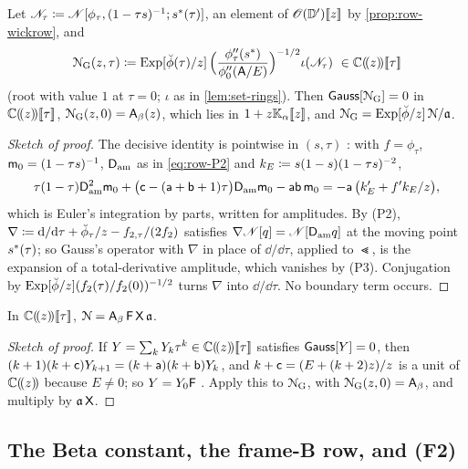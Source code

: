 \begin{prop}
\label{prop:row-gaussode}
Let $\mathscr{N}_{\tau}\coloneqq\mathscr{N}[\phi_\tau,(1-\tau s)^{-1};s^{\ast}(\tau)]$, an element of $\mathscr{O}(\mathbb{D}')[\![ z ]\!]$ by \cref{prop:row-wickrow}, and
\[
\Ngauss(z,\tau)\coloneqq\mathrm{Exp}[\dphi(\tau)/z]\,\Big(\frac{\phi_\tau''(\sast)}{\phi_0''(\wA/E)}\Big)^{-1/2}\iota(\Lt)\ \in\Cz\fps\tau
\]
(root with value $1$ at $\tau=0$; $\iota$ as in \cref{lem:set-rings}). Then $\mathsf{Gauss}[\mathcal{N}_{\mathrm{G}}]=0$ in $\mathbb{C}(\!(z)\!)[\![ \tau ]\!]$, $\mathcal{N}_{\mathrm{G}}(z,0)=\mathsf{A}_{\beta}(z)$, which lies in $1+z\mathbb{K}_{\alpha}[\![ z ]\!]$, and $\mathcal{N}_{\mathrm{G}}=\mathrm{Exp}[\breve{\phi}/z]\,\mathcal{N}/\mathfrak{a}$.
\end{prop}

\begin{proof}[Sketch of proof]
The decisive identity is pointwise in $(s,\tau)$ : with $f=\phi_\tau$, $\mathsf{m}_0=(1-\tau s)^{-1}$, $\mathsf{D}_{\mathrm{am}}$ as in \eqref{eq:row-P2} and $k_E\coloneqq s(1-s)(1-\tau s)^{-2}$,
\[
\tau(1-\tau)\mathsf{D}_{\mathrm{am}}^2\mathsf{m}_0+\big(\mathsf{c}-(\mathsf{a}+\mathsf{b}+1)\tau\big)\mathsf{D}_{\mathrm{am}}\mathsf{m}_0-\mathsf{a}\mathsf{b}\,\mathsf{m}_0=-\mathsf{a}\,\big(k_E'+f'k_E/z\big),
\]
which is Euler's integration by parts, written for amplitudes. By (P2), $\nabla\coloneqq\mathrm{d}/\mathrm{d}\tau+\breve{\phi}_\tau/z-f_{2,\tau}/(2f_2)$ satisfies $\nabla\mathscr{N}[q]=\mathscr{N}[\mathsf{D}_{\mathrm{am}} q]$ at the moving point $s^{\ast}(\tau)$; so Gauss's operator with $\nabla$ in place of $\dd/\dd\tau$, applied to $\Lt$, is the expansion of a total-derivative amplitude, which vanishes by (P3). Conjugation by $\mathrm{Exp}[\breve{\phi}/z](f_2(\tau)/f_2(0))^{-1/2}$ turns $\nabla$ into $\dd/\dd\tau$. No boundary term occurs.
\end{proof}

\begin{thm}
\label{thm:row-closed}
In $\mathbb{C}(\!(z)\!)[\![ \tau ]\!]$, $\mathcal{N}=\mathsf{A}_{\beta}\,\mathsf{F}\,\mathsf{X}\,\mathfrak{a}$.
\end{thm}

\begin{proof}[Sketch of proof]
If $Y=\sum_kY_k\tau^k\in\mathbb{C}(\!(z)\!)[\![ \tau ]\!]$ satisfies $\mathsf{Gauss}[Y]=0$, then $(k+1)(k+\mathsf{c})Y_{k+1}=(k+\mathsf{a})(k+\mathsf{b})Y_k$, and $k+\mathsf{c}=(E+(k+2)z)/z$ is a unit of $\mathbb{C}(\!(z)\!)$ because $E\neq0$; so $Y=Y_0\mathsf{F}$ . Apply this to $\mathcal{N}_{\mathrm{G}}$, with $\mathcal{N}_{\mathrm{G}}(z,0)=\mathsf{A}_{\beta}$, and multiply by $\mathfrak{a}\,\mathsf{X}$.
\end{proof}

\subsection{The Beta constant, the frame-B row, and (F2)}
\label{sec:row-beta}


